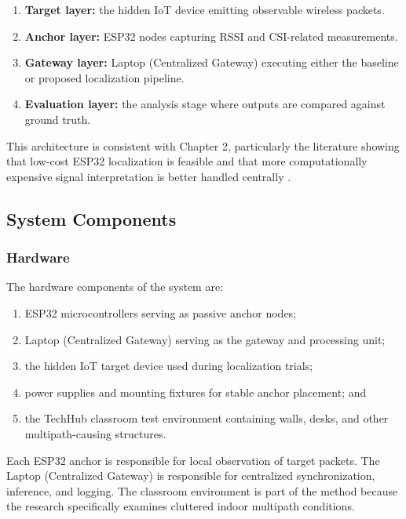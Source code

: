 \begin{enumerate}
    \item \textbf{Target layer:} the hidden IoT device emitting observable wireless packets.
    \item \textbf{Anchor layer:} ESP32 nodes capturing RSSI and CSI-related measurements.
    \item \textbf{Gateway layer:} Laptop (Centralized Gateway) executing either the baseline or proposed localization pipeline.
    \item \textbf{Evaluation layer:} the analysis stage where outputs are compared against ground truth.
\end{enumerate}

This architecture is consistent with Chapter 2, particularly the literature showing that low-cost ESP32 localization is feasible and that more computationally expensive signal interpretation is better handled centrally \cite{mottakin2024swiloc,li2024efficient}.

\subsection{System Components}

\subsubsection{Hardware}

The hardware components of the system are:

\begin{enumerate}
    \item ESP32 microcontrollers serving as passive anchor nodes;
    \item Laptop (Centralized Gateway) serving as the gateway and processing unit;
    \item the hidden IoT target device used during localization trials;
    \item power supplies and mounting fixtures for stable anchor placement; and
    \item the TechHub classroom test environment containing walls, desks, and other multipath-causing structures.
\end{enumerate}

Each ESP32 anchor is responsible for local observation of target packets. The Laptop (Centralized Gateway) is responsible for centralized synchronization, inference, and logging. The classroom environment is part of the method because the research specifically examines cluttered indoor multipath conditions.

